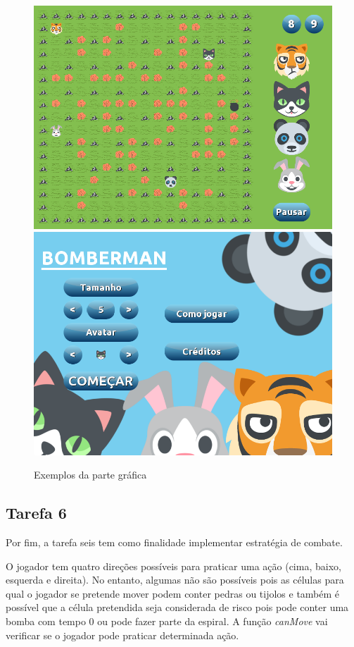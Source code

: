 \documentclass[a4paper]{article}
\begin{document}
\begin{figure}[H]
      \centering
      \caption{Exemplos da parte gráfica}
      \includegraphics[scale=0.2]{jogo.png}
      \includegraphics[scale=0.2]{jogo1.png}
\end{figure}

\vspace{0.5cm}

\subsection{Tarefa 6} Por fim, a tarefa seis tem como finalidade implementar estratégia de combate.\par O jogador tem quatro direções possíveis para praticar uma ação (cima, baixo, esquerda e direita). No entanto, algumas não são possíveis pois as células para qual o jogador se pretende mover podem conter pedras ou tijolos e também é possível que a célula pretendida seja considerada de risco pois pode conter uma bomba com tempo 0 ou pode fazer parte da espiral. A função \emph{canMove} vai verificar se o jogador pode praticar determinada ação.
\end{document}
